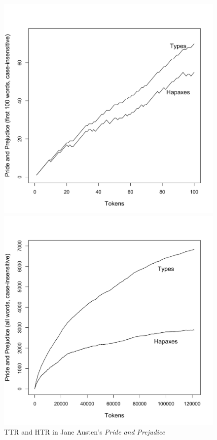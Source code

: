 \begin{figure}
\caption{TTR and HTR in Jane Austen's \textit{Pride and Prejudice}}
\label{fig:typehapaxausten}
\begin{minipage}{.5\textwidth}
 \centering
 \includegraphics[width=\textwidth]{figures/prideandprejudiceonehundred}
\end{minipage}%
\begin{minipage}{.5\textwidth}
 \centering
 \includegraphics[width=\textwidth]{figures/prideandprejudiceall}
\end{minipage}
\end{figure}

